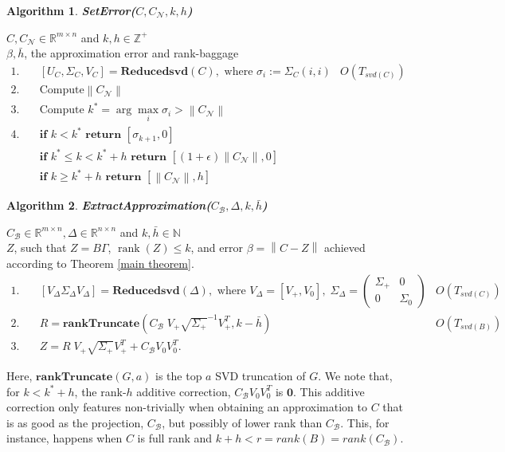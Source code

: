 \documentclass[11pt]{article}
\newcommand{\rank}{\operatorname{rank}}
\newtheorem{alg}{Algorithm}
\def\reals{\mathbb{R}}
\newcommand{\norm}[1]{\left\|#1\right\|}
\newcommand{\B}{\mathcal{B}}
\newcommand{\N}{\mathcal{N}}
\newcommand{\G}{\Gamma}
\newcommand{\0}{\ensuremath{\mathbf{0}}}
\renewcommand{\>}{\succ}
\newcommand{\<}{\prec}
\begin{document}
\begin{framed}
\begin{alg}\label{alg:seterr}
{\bf SetError($C, C_{\N}, k, h$) }
\end{alg}
 $C, C_{\N} \in \reals^{m \times n}$ and $k, h \in \mathbb{Z^+}$\\
 $\beta, \bar h$, the approximation error and rank-baggage
%
\begin{align*}
1. \quad& [U_C, \Sigma_C, V_C] = \textbf{Reducedsvd}(C), \text{ where } \sigma_i := \Sigma_C (i, i)  & O\left( T_{svd(C)} \right) \\
2. \quad& \text{Compute} \norm{C_{\N}}\\
3. \quad& \text{Compute } k^* = \arg \max_i \sigma_i > \norm{C_{\N}} \\
4. \quad& \textbf{if } k < k^* \textbf{ return } [\sigma_{k+1}, 0] \\
 \quad& \textbf{if } k^* \leq k < k^* + h \textbf{ return } [(1 + \epsilon) \norm{C_{\N}}, 0] \\
\quad& \textbf{if } k \geq k^* + h \textbf{ return } [\norm{C_{\N}}, h] 
\end{align*}
%
\end{framed}


\begin{framed}
\begin{alg}\label{alg:extractApprox}
{\bf ExtractApproximation($C_{\B}, \Delta, k, \bar h$) }
\end{alg}
 $C_{\B} \in \reals^{m \times n}, \Delta \in \reals^{n \times n}$ and $k, \bar h \in \mathbb{N}$\\
 $Z$, such that $Z=B \G$, $\rank(Z) \leq k$, and error $\beta = \norm{C - Z}$ achieved according to Theorem \ref{main theorem}.
%
\begin{align*}
1. \quad& [V_{\Delta} \Sigma_{\Delta} V_{\Delta}] = \textbf{Reducedsvd} (\Delta),\text{ where } V_{\Delta} = [V_+, V_0],\; \Sigma_{\Delta} = \begin{pmatrix} \Sigma_+ & 0 \\ 0 & \Sigma_0 \end{pmatrix} & O\left(T_{svd(C)} \right)\\
2. \quad& R = \textbf{rankTruncate}\left( C_{\B} \; V_+ \sqrt{\Sigma_+}^{-1} V_+ ^T, k - \bar h \right)  & O\left( T_{svd(B)} \right)\\
3. \quad& Z = R \; V_+ \sqrt{\Sigma_+} V_+ ^T  + C_{\B} V_0 V_0 ^T.
\end{align*}
%
\end{framed}
\noindent Here, $\textbf{rankTruncate}(G, a)$ is the top $a$ SVD truncation of $G$. We note that, for $k < k^* + h$, the rank-$h$ additive correction, $C_{\B} V_0 V_0 ^T$ is $\mathbf{0}$. This additive correction only features non-trivially when obtaining an approximation to $C$ that is as good as the projection, $C_{\B}$, but possibly of lower rank than $C_{\B}$. This, for instance, happens when $C$ is full rank and $k + h < r = rank(B) = rank(C_{\B})$. 
\end{document}

